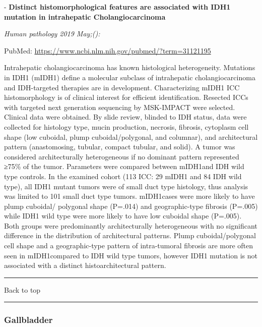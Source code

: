 \documentclass[]{article}
\begin{document}
 - \textbf{Distinct histomorphological features are associated with IDH1
mutation in intrahepatic Cholangiocarcinoma}

\emph{Human pathology 2019 May;():}

PubMed: \url{https://www.ncbi.nlm.nih.gov/pubmed/?term=31121195}

Intrahepatic cholangiocarcinoma has known histological heterogeneity.
Mutations in IDH1 (mIDH1) define a molecular subclass of intrahepatic
cholangiocarcinoma and IDH-targeted therapies are in development.
Characterizing mIDH1 ICC histomorphology is of clinical interest for
efficient identification. Resected ICCs with targeted next generation
sequencing by MSK-IMPACT were selected. Clinical data were obtained. By
slide review, blinded to IDH status, data were collected for histology
type, mucin production, necrosis, fibrosis, cytoplasm cell shape (low
cuboidal, plump cuboidal/polygonal, and columnar), and architectural
pattern (anastomosing, tubular, compact tubular, and solid). A tumor was
considered architecturally heterogeneous if no dominant pattern
represented ≥75\% of the tumor. Parameters were compared between
mIDH1and IDH wild type controls. In the examined cohort (113 ICC: 29
mIDH1 and 84 IDH wild type), all IDH1 mutant tumors were of small duct
type histology, thus analysis was limited to 101 small duct type tumors.
mIDH1cases were more likely to have plump cuboidal/ polygonal shape
(P=.014) and geographic-type fibrosis (P=.005) while IDH1 wild type were
more likely to have low cuboidal shape (P=.005). Both groups were
predominantly architecturally heterogeneous with no significant
difference in the distribution of architectural patterns. Plump
cuboidal/polygonal cell shape and a geographic-type pattern of
intra-tumoral fibrosis are more often seen in mIDH1compared to IDH wild
type tumors, however IDH1 mutation is not associated with a distinct
histoarchitectural pattern.

{}

{}

\begin{center}\rule{0.5\linewidth}{\linethickness}\end{center}

Back to top

\begin{center}\rule{0.5\linewidth}{\linethickness}\end{center}

\pagebreak

\hypertarget{gallbladder}{%
\subsubsection{Gallbladder}\label{gallbladder}}
\end{document}
